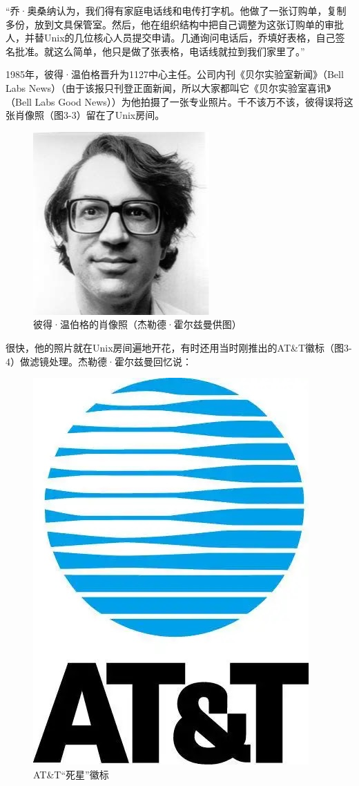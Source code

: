 \documentclass[a4paper,12pt,UTF8,twoside]{ctexbook}
\begin{document}
“乔·奥桑纳认为，我们得有家庭电话线和电传打字机。他做了一张订购单，复制多份，放到文具保管室。然后，他在组织结构中把自己调整为这张订购单的审批人，并替Unix的几位核心人员提交申请。几通询问电话后，乔填好表格，自己签名批准。就这么简单，他只是做了张表格，电话线就拉到我们家里了。”

1985年，彼得·温伯格晋升为1127中心主任。公司内刊《贝尔实验室新闻》（Bell Labs News）（由于该报只刊登正面新闻，所以大家都叫它《贝尔实验室喜讯》（Bell Labs Good News））为他拍摄了一张专业照片。千不该万不该，彼得误将这张肖像照（图3-3）留在了Unix房间。

\begin{figure}[htbp]
	\centering
	\includegraphics[width=0.7\linewidth]{21}
	\caption{彼得·温伯格的肖像照（杰勒德·霍尔兹曼供图）}
	\label{fig:1}
\end{figure}

很快，他的照片就在Unix房间遍地开花，有时还用当时刚推出的AT\&T徽标（图3-4）做滤镜处理。杰勒德·霍尔兹曼回忆说：

\begin{figure}[htbp]
	\centering
	\includegraphics[width=0.7\linewidth]{22}
	\caption{AT\&T“死星”徽标}
	\label{fig:1}
\end{figure}
\end{document}
